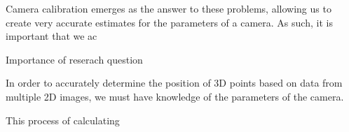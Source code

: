 Camera calibration emerges as the answer to these problems, allowing us to create very accurate estimates for the parameters of a camera. As such, it is important that we ac

 







Importance of reserach question

In order to accurately determine the position of 3D points based on data from multiple 2D images, we must have knowledge of the parameters of the camera.

This process of calculating








